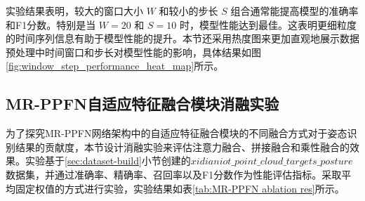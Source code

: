 实验结果表明，较大的窗口大小 \( W \) 和较小的步长 \( S \) 组合通常能提高模型的准确率和F1分数。特别是当 \( W = 20 \) 和 \( S = 10 \) 时，模型性能达到最佳。这表明更细粒度的时间序列信息有助于模型性能的提升。本节还采用热度图来更加直观地展示数据预处理中时间窗口和步长对模型性能的影响，具体结果如图\eqref{fig:window_step_performance_heat_map}所示。



\subsection{MR-PPFN自适应特征融合模块消融实验}
为了探究MR-PPFN网络架构中的自适应特征融合模块的不同融合方式对于姿态识别结果的贡献度，本节设计消融实验来评估注意力融合、拼接融合和乘性融合的效果。实验基于\eqref{sec:dataset-build}小节创建的$xidianiot\_point\_cloud\_targets\_posture$数据集，并通过准确率、精确率、召回率以及F1分数作为性能评估指标。采取平均固定权值的方式进行实验，实验结果如表\eqref{tab:MR-PPFN ablation res}所示。


